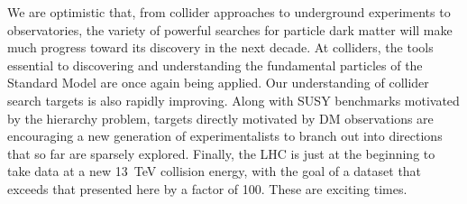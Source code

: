 
We are optimistic that, from collider approaches to underground experiments to observatories, the variety of powerful searches for particle dark matter will make much progress toward its discovery in the next decade.
At colliders, the tools essential to discovering and understanding the fundamental particles of the Standard Model are once again being applied.
Our understanding of collider search targets is also rapidly improving.
Along with SUSY benchmarks motivated by the hierarchy problem, targets directly motivated by DM observations are encouraging a new generation of experimentalists to branch out into directions that so far are sparsely explored.
Finally, the LHC is just at the beginning to take data at a new 13~TeV collision energy, with the goal of a dataset that exceeds that presented here by a factor of 100.
These are exciting times.

















